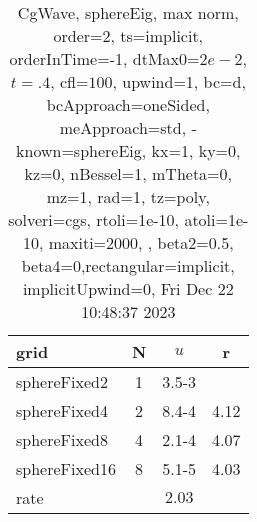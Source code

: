 \begin{table}[H]\tableFont %
\begin{center}
\begin{tabular}{|l|c|c|c|} \hline 
grid  & N &  $ u $ & r \\ \hline 
  sphereFixed2 &     1 & \num{3.5}{-3} &        \\ \hline
  sphereFixed4 &     2 & \num{8.4}{-4} &  4.12  \\ \hline
  sphereFixed8 &     4 & \num{2.1}{-4} &  4.07  \\ \hline
 sphereFixed16 &     8 & \num{5.1}{-5} &  4.03  \\ \hline
    rate             &       &  $2.03$       &       \\ \hline
\end{tabular}
\caption{CgWave, sphereEig, max norm, order=$2$, ts=implicit, orderInTime=-1, dtMax0=$2e-2$, $t=.4$, cfl=$100$, upwind=1, bc=d, bcApproach=oneSided, meApproach=std, -known=sphereEig, kx=1, ky=0, kz=0, nBessel=1, mTheta=0, mz=1, rad=1, tz=poly, solveri=cgs, rtoli=1e-10, atoli=1e-10, maxiti=2000, , beta2=0.5, beta4=0,rectangular=implicit, implicitUpwind=0, Fri Dec 22 10:48:37 2023}\label{table:sphereEigOrder2max}
\end{center}
\end{table}
